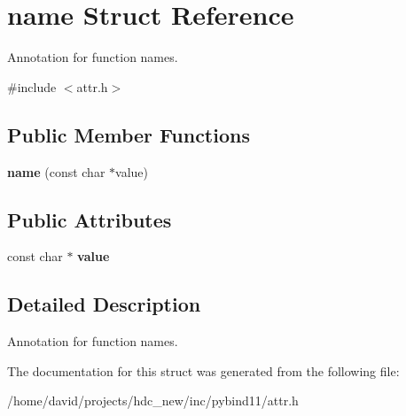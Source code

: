 \hypertarget{structname}{}\section{name Struct Reference}
\label{structname}


Annotation for function names.  




{\ttfamily \#include $<$attr.\+h$>$}

\subsection*{Public Member Functions}
\begin{DoxyCompactItemize}
\item 
{\bfseries name} (const char $\ast$value)\hypertarget{structname_ac4fea0d283ba29072b06f830fba403d2}{}\label{structname_ac4fea0d283ba29072b06f830fba403d2}

\end{DoxyCompactItemize}
\subsection*{Public Attributes}
\begin{DoxyCompactItemize}
\item 
const char $\ast$ {\bfseries value}\hypertarget{structname_a86a1d2e431af94bee2c79e1d102eb4c7}{}\label{structname_a86a1d2e431af94bee2c79e1d102eb4c7}

\end{DoxyCompactItemize}


\subsection{Detailed Description}
Annotation for function names. 

The documentation for this struct was generated from the following file\+:\begin{DoxyCompactItemize}
\item 
/home/david/projects/hdc\+\_\+new/inc/pybind11/attr.\+h\end{DoxyCompactItemize}
